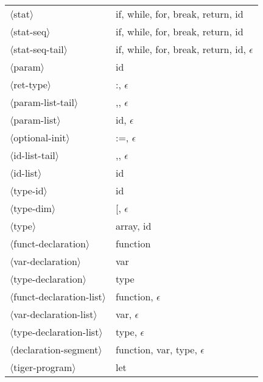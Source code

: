 \documentclass[11pt, fleqn]{article}
\newcommand{\atag}[1]{$\langle$#1$\rangle$}
\begin{document}
\begin{longtable}{l|l}
\atag{stat}						&	if, while, for, break, return, id		\\
\atag{stat-seq}					&	if, while, for, break, return, id		\\
\atag{stat-seq-tail}				&	if, while, for, break, return, id, $\epsilon$		\\
\atag{param}						&	id		\\
\atag{ret-type}					&	:, $\epsilon	$	\\
\atag{param-list-tail}			&	,, $\epsilon$		\\
\atag{param-list}				&	id, $\epsilon$		\\
\atag{optional-init}				&	:=, $\epsilon$		\\
\atag{id-list-tail}				&	,, $\epsilon$		\\
\atag{id-list}					&	id		\\
\atag{type-id}					&	id		\\
\atag{type-dim}					&	[, $\epsilon$	\\
\atag{type}						&	array, id		\\
\atag{funct-declaration}			&	function		\\
\atag{var-declaration}			&	var \\
\atag{type-declaration}			&	type 		\\
\atag{funct-declaration-list}	&	function, $\epsilon$	\\
\atag{var-declaration-list}		&	var, $\epsilon$	\\
\atag{type-declaration-list}		&	type, $\epsilon$		\\
\atag{declaration-segment}		&	function, var, type, $\epsilon$	\\
\atag{tiger-program}				&	let				\\
\end{longtable}
\end{document}

